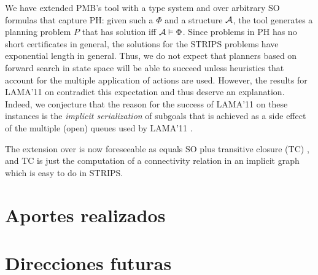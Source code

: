 We have extended PMB's tool with a type system and over
arbitrary SO formulas that capture PH:
given such a $\Phi$ and a structure $\mathcal{A}$, the tool
generates a planning problem $P$ that has solution iff $\mathcal{A}\vDash\Phi$.
Since problems in PH has no short certificates in general, the solutions
for the STRIPS problems have exponential length in general.
Thus, we do not expect that planners based on forward search in state space
will be able to succeed unless heuristics that account for the multiple
application of actions are used.
However, the results for LAMA'11 on \coCOL contradict this expectation and
thus deserve an explanation. Indeed, we conjecture that the reason for
the success of LAMA'11 on these instances is the \emph{implicit serialization}
of subgoals that is achieved as a side effect of the multiple (open) queues
used by LAMA'11 \cite{richter:lama,lipovetzky:ecai12-width}.

The extension over \PSPACE is now foreseeable as \PSPACE equals SO plus
transitive closure (TC) \cite{immerman:book}, and TC is just the
computation of a connectivity relation in an implicit graph which
is easy to do in STRIPS.

\section{Aportes realizados}
\section{Direcciones futuras}
